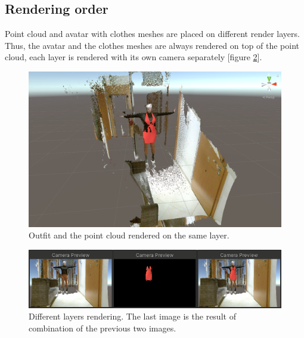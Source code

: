 \documentclass[a4paper]{report}
\begin{document}
\subsection{Rendering order} 

\qquad Point cloud and avatar with clothes meshes are placed on different render layers. Thus, the avatar and the clothes meshes are always rendered on top of the point cloud, each layer is rendered with its own camera separately [figure \ref{fig:rendering_clothes_order_2}].

 \begin{figure}[H]
  \includegraphics[width=\textwidth, keepaspectratio]{images/ClothesDemos/Screenshot 2021-05-14 190249.png}
  \caption{ Outfit and the point cloud rendered on the same layer.} 
  \label{fig:rendering_clothes_order_1}
\end{figure}





 \begin{figure}[H]
    
  \includegraphics[width=\textwidth, keepaspectratio]{images/ClothesDemos/render_layers_1.png}
  \caption{Different layers rendering. The last image is the result of combination of the previous two images.} 
  \label{fig:rendering_clothes_order_2}
\end{figure}
\end{document}
